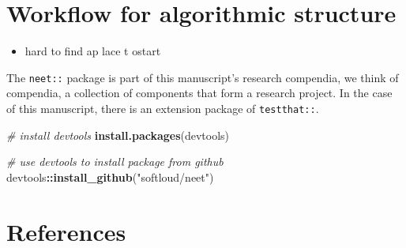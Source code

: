 \documentclass[
]{article}
\newenvironment{Shaded}{\begin{snugshade}}{\end{snugshade}}
\newcommand{\CommentTok}[1]{\textcolor[rgb]{0.56,0.35,0.01}{\textit{#1}}}
\newcommand{\KeywordTok}[1]{\textcolor[rgb]{0.13,0.29,0.53}{\textbf{#1}}}
\newcommand{\NormalTok}[1]{#1}
\newcommand{\OperatorTok}[1]{\textcolor[rgb]{0.81,0.36,0.00}{\textbf{#1}}}
\newcommand{\StringTok}[1]{\textcolor[rgb]{0.31,0.60,0.02}{#1}}
\providecommand{\tightlist}{%
  \setlength{\itemsep}{0pt}\setlength{\parskip}{0pt}}
\begin{document}
\hypertarget{workflow-for-algorithmic-structure}{%
\section{Workflow for algorithmic structure}\label{workflow-for-algorithmic-structure}}

\begin{itemize}
\tightlist
\item
  hard to find ap lace t ostart
\end{itemize}

The \texttt{neet::} package is part of this manuscript's research compendia, we think of compendia, a collection of components that form a research project. In the case of this manuscript, there is an extension package of \texttt{testthat::}.

\begin{Shaded}
\begin{Highlighting}[]
\CommentTok{\# install devtools}
\KeywordTok{install.packages}\NormalTok{(devtools) }

\CommentTok{\# use devtools to install package from github}
\NormalTok{devtools}\OperatorTok{::}\KeywordTok{install\_github}\NormalTok{(}\StringTok{"softloud/neet"}\NormalTok{)}
\end{Highlighting}
\end{Shaded}

\hypertarget{references}{%
\section*{References}\label{references}}
\end{document}
